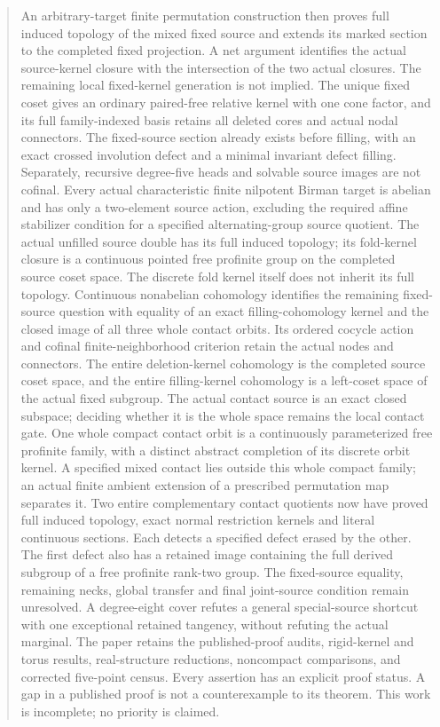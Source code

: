 \documentclass[11pt,a4paper]{article}
\begin{document}
\begin{abstract}
An arbitrary-target finite permutation construction then proves full
induced topology of the mixed fixed source and extends its marked
section to the completed fixed projection. A net argument identifies
the actual source-kernel closure with the intersection of the two
actual closures. The remaining local fixed-kernel generation is not
implied.
The unique fixed coset gives an ordinary paired-free relative kernel
with one cone factor, and its full family-indexed basis retains all
deleted cores and actual nodal connectors. The fixed-source section
already exists before filling, with an exact crossed involution defect
and a minimal invariant defect filling. Separately, recursive degree-five
heads and solvable source images are not cofinal. Every actual
characteristic finite nilpotent Birman target is abelian and has only
a two-element source action, excluding the required affine stabilizer
condition for a specified alternating-group source quotient.
The actual unfilled source double has its full induced topology; its
fold-kernel closure is a continuous pointed free profinite group on
the completed source coset space. The discrete fold kernel itself
does not inherit its full topology. Continuous nonabelian cohomology
identifies the remaining fixed-source question with equality of an
exact filling-cohomology kernel and the closed image of all three
whole contact orbits. Its ordered cocycle action and cofinal
finite-neighborhood criterion retain the actual nodes and connectors.
The entire deletion-kernel cohomology is the completed source coset
space, and the entire filling-kernel cohomology is a left-coset
space of the actual fixed subgroup. The actual contact source
is an exact closed subspace; deciding whether it is the whole
space remains the local contact gate.
One whole compact contact orbit is a continuously parameterized
free profinite family, with a distinct abstract completion of its
discrete orbit kernel. A specified mixed contact lies outside this
whole compact family; an actual finite ambient extension of a
prescribed permutation map separates it.
Two entire complementary contact quotients now have proved full
induced topology, exact normal restriction kernels and literal
continuous sections. Each detects a specified defect erased by
the other. The first defect also has a retained image containing
the full derived subgroup of a free profinite rank-two group.
The fixed-source equality, remaining necks, global transfer and final
joint-source condition remain unresolved. A degree-eight cover refutes
a general special-source shortcut with one exceptional retained
tangency, without refuting the actual marginal. The paper retains the published-proof audits, rigid-kernel
and torus results, real-structure reductions, noncompact comparisons,
and corrected five-point census. Every assertion has an explicit proof
status. A gap in a published proof is not a counterexample to its theorem.
This work is incomplete; no priority is claimed.
\end{abstract}
\tableofcontents
\clearpage
\end{document}
